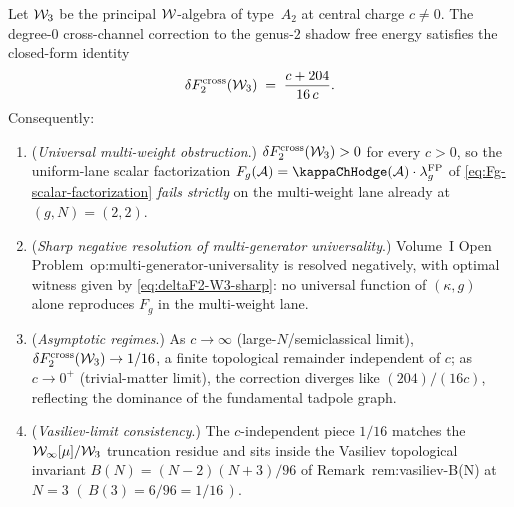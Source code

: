\begin{theorem}
\label{thm:deltaF2-W3-sharp}
Let $\mathcal{W}_3$ be the principal $\mathcal{W}$-algebra of type~$A_2$ at
central charge $c \neq 0$. The degree-$0$ cross-channel
correction to the genus-$2$ shadow free energy satisfies the
closed-form identity
\begin{equation}\label{eq:deltaF2-W3-sharp}
\delta F_2^{\mathrm{cross}}(\mathcal{W}_3)
\;=\; \frac{c + 204}{16\,c}.
\end{equation}
Consequently:
\begin{enumerate}[label=\textup{(\roman*)}]
\item (\emph{Universal multi-weight obstruction}.)
$\delta F_2^{\mathrm{cross}}(\mathcal{W}_3) > 0$ for every
$c > 0$, so the uniform-lane scalar factorization
$F_g(\cA) = \kappaChHodge(\cA)\cdot\lambda_g^{\mathrm{FP}}$ of
\eqref{eq:Fg-scalar-factorization} \emph{fails strictly}
on the multi-weight lane already at $(g,N) = (2,2)$.
\item (\emph{Sharp negative resolution of
multi-generator universality}.) Volume~I Open
Problem~op:multi-generator-universality is resolved
negatively, with optimal witness given by
\eqref{eq:deltaF2-W3-sharp}: no universal function of
$(\kappa,g)$ alone reproduces $F_g$ in the multi-weight
lane.
\item (\emph{Asymptotic regimes}.) As $c \to \infty$
(large-$N$/semiclassical limit), $\delta
F_2^{\mathrm{cross}}(\mathcal{W}_3) \to 1/16$, a finite topological
remainder independent of $c$; as $c \to 0^+$
(trivial-matter limit), the correction diverges like
$(204)/(16c)$, reflecting the dominance of the fundamental
tadpole graph.
\item (\emph{Vasiliev-limit consistency}.) The
$c$-independent piece $1/16$ matches the
$\mathcal{W}_\infty[\mu]/\mathcal{W}_3$ truncation residue and sits inside
the Vasiliev topological invariant
$B(N) = (N{-}2)(N{+}3)/96$ of
Remark~\textup{rem:vasiliev-B(N)} at $N=3$
$(\,B(3) = 6/96 = 1/16\,)$.
\end{enumerate}
\end{theorem}

